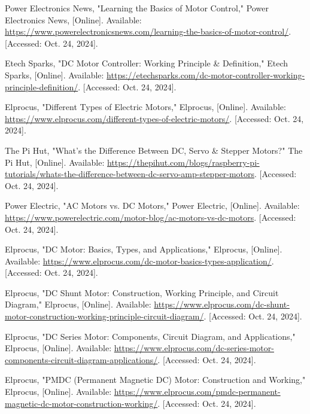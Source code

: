 \begin{thebibliography}{45}
	 Power Electronics News, "Learning the Basics of Motor Control," Power Electronics News, [Online]. Available: \href{https://www.powerelectronicsnews.com/learning-the-basics-of-motor-control/}{https://www.powerelectronicsnews.com/learning-the-basics-of-motor-control/}. [Accessed: Oct. 24, 2024].
	
	 Etech Sparks, "DC Motor Controller: Working Principle \& Definition," Etech Sparks, [Online]. Available: \href{https://etechsparks.com/dc-motor-controller-working-principle-definition/}{https://etechsparks.com/dc-motor-controller-working-principle-definition/}. [Accessed: Oct. 24, 2024].
	
	 Elprocus, "Different Types of Electric Motors," Elprocus, [Online]. Available: \url{https://www.elprocus.com/different-types-of-electric-motors/}. [Accessed: Oct. 24, 2024]. 
	
	 The Pi Hut, "What's the Difference Between DC, Servo \& Stepper Motors?" The Pi Hut, [Online]. Available: \url{https://thepihut.com/blogs/raspberry-pi-tutorials/whats-the-difference-between-dc-servo-amp-stepper-motors}. [Accessed: Oct. 24, 2024]. 
	
	 Power Electric, "AC Motors vs. DC Motors," Power Electric, [Online]. Available: \url{https://www.powerelectric.com/motor-blog/ac-motors-vs-dc-motors}. [Accessed: Oct. 24, 2024]. 
	
	 Elprocus, "DC Motor: Basics, Types, and Applications," Elprocus, [Online]. Available: \url{https://www.elprocus.com/dc-motor-basics-types-application/}. [Accessed: Oct. 24, 2024]. 
	
	 Elprocus, "DC Shunt Motor: Construction, Working Principle, and Circuit Diagram," Elprocus, [Online]. Available: \url{https://www.elprocus.com/dc-shunt-motor-construction-working-principle-circuit-diagram/}. [Accessed: Oct. 24, 2024]. 
	
	 Elprocus, "DC Series Motor: Components, Circuit Diagram, and Applications," Elprocus, [Online]. Available: \url{https://www.elprocus.com/dc-series-motor-components-circuit-diagram-applications/}. [Accessed: Oct. 24, 2024]. 
	
	 Elprocus, "PMDC (Permanent Magnetic DC) Motor: Construction and Working," Elprocus, [Online]. Available: \url{https://www.elprocus.com/pmdc-permanent-magnetic-dc-motor-construction-working/}. [Accessed: Oct. 24, 2024]. 
	

\end{thebibliography}

